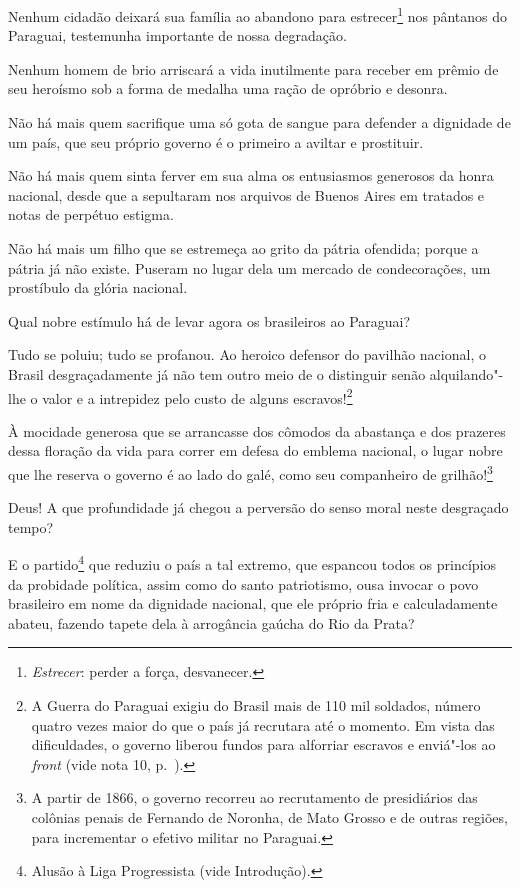  Nenhum cidadão deixará sua família ao abandono para
estrecer\footnote{ \textit{Estrecer}: perder a força, desvanecer.}
 nos pântanos do Paraguai, testemunha importante de nossa degradação.

 Nenhum homem de brio arriscará a vida inutilmente para receber em
prêmio de seu heroísmo sob a forma de medalha uma ração de opróbrio e desonra.

 Não há mais quem sacrifique uma só gota de sangue para defender a
dignidade de um país, que seu próprio governo é o primeiro a aviltar e prostituir.

 Não há mais quem sinta ferver em sua alma os entusiasmos generosos da
honra nacional, desde que a sepultaram nos arquivos de Buenos Aires em
tratados e notas de perpétuo estigma.

 Não há mais um filho que se estremeça ao grito da pátria ofendida;
porque a pátria já não existe. Puseram no lugar dela um mercado de
condecorações, um prostíbulo da glória nacional.

 Qual nobre estímulo há de levar agora os brasileiros ao Paraguai?

 Tudo se poluiu; tudo se profanou. Ao heroico defensor do pavilhão
nacional, o Brasil desgraçadamente já não tem outro meio de o
distinguir senão alquilando"-lhe o valor e a intrepidez pelo custo de
alguns escravos!\footnote{ A Guerra do Paraguai exigiu do Brasil mais de 
110 mil soldados, número quatro vezes maior do que o país já recrutara até o momento. 
Em vista das dificuldades, o governo liberou fundos para alforriar escravos 
e enviá"-los ao \textit{front} (vide nota 10, p.~\pageref{nota10}).} 

 À mocidade generosa que se arrancasse dos cômodos da abastança e dos
prazeres dessa floração da vida para correr em defesa do emblema
nacional, o lugar nobre que lhe reserva o governo é ao lado do galé,
como seu companheiro de grilhão!\footnote{ A partir de 1866, o governo recorreu ao 
recrutamento de presidiários das colônias penais de Fernando de Noronha, de Mato Grosso 
e de outras regiões, para incrementar o efetivo militar no Paraguai.}

 Deus! A que profundidade já chegou a perversão do senso moral neste
desgraçado tempo? 

 E o partido\footnote{ Alusão à Liga Progressista (vide Introdução).}
 que reduziu o país a tal extremo, que espancou todos os princípios da
probidade política, assim como do santo patriotismo, ousa invocar o
povo brasileiro em nome da dignidade nacional, que ele próprio fria e
calculadamente abateu, fazendo tapete dela à arrogância gaúcha do Rio da Prata?

